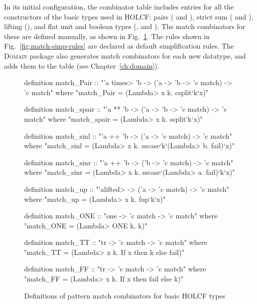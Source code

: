 In its initial configuration, the combinator table includes entries for all the constructors of the basic types used in HOLCF: pairs ( and ), strict sum ( and ), lifting (), and flat unit and boolean types (,  and ). The match combinators for these are defined manually, as shown in Fig.~\ref{fig:match-definitions}. The rules shown in Fig.~\ref{fig:match-simp-rules} are declared as default simplification rules. The \textsc{Domain} package also generates match combinators for each new datatype, and adds them to the table (see Chapter~\ref{ch:domain}).

\begin{figure}
\begin{isacode}
definition match_Pair :: "'a \<times> 'b -> ('a -> 'b -> 'c match) -> 'c match"
  where "match_Pair = (\<Lambda> x k. csplit`k`x)"
\end{isacode}
\unmedskip
{}
\begin{isacode}
definition match_spair :: "'a ** 'b -> ('a -> 'b -> 'c match) -> 'c match"
  where "match_spair = (\<Lambda> x k. ssplit`k`x)"
\end{isacode}
\unmedskip
{}
\begin{isacode}
definition match_sinl :: "'a ++ 'b -> ('a -> 'c match) -> 'c match"
  where "match_sinl = (\<Lambda> x k. sscase`k`(\<Lambda> b. fail)`x)"
\end{isacode}
\unmedskip
{}
\begin{isacode}
definition match_sinr :: "'a ++ 'b -> ('b -> 'c match) -> 'c match"
  where "match_sinr = (\<Lambda> x k. sscase`(\<Lambda> a. fail)`k`x)"
\end{isacode}
\unmedskip
{}
\begin{isacode}
definition match_up :: "'a\<lifted> -> ('a -> 'c match) -> 'c match"
  where "match_up = (\<Lambda> x k. fup`k`x)"
\end{isacode}
\unmedskip
{}
\begin{isacode}
definition match_ONE :: "one -> 'c match -> 'c match"
  where "match_ONE = (\<Lambda> ONE k. k)"
\end{isacode}
\unmedskip
{}
\begin{isacode}
definition match_TT :: "tr -> 'c match -> 'c match"
  where "match_TT = (\<Lambda> x k. If x then k else fail)"
\end{isacode}
\unmedskip
{}
\begin{isacode}
definition match_FF :: "tr -> 'c match -> 'c match"
  where "match_FF = (\<Lambda> x k. If x then fail else k)"
\end{isacode}
\caption{Definitions of pattern match combinators for basic HOLCF types}
\label{fig:match-definitions}
\end{figure}

